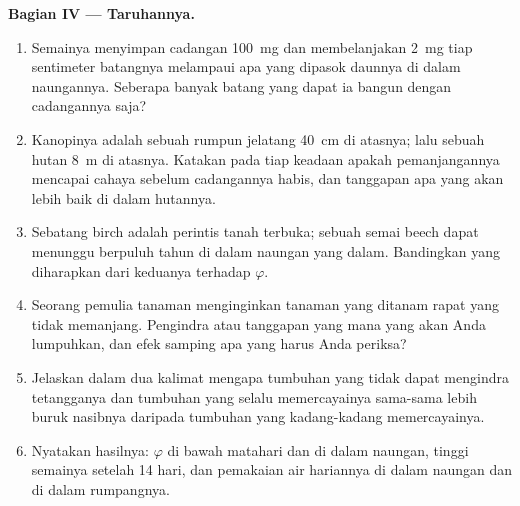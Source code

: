 \begin{problem}
\medskip
\noindent\textbf{Bagian IV --- Taruhannya.}
\begin{enumerate}[resume]
  \item Semainya menyimpan cadangan \qty{100}{mg} dan membelanjakan
        \qty{2}{mg} tiap sentimeter batangnya melampaui apa yang
        dipasok daunnya di dalam naungannya. Seberapa banyak batang
        yang dapat ia bangun dengan cadangannya saja?
  \item Kanopinya adalah sebuah rumpun jelatang \qty{40}{cm} di
        atasnya; lalu sebuah hutan \qty{8}{m} di atasnya. Katakan pada
        tiap keadaan apakah pemanjangannya mencapai cahaya sebelum
        cadangannya habis, dan tanggapan apa yang akan lebih baik di
        dalam hutannya.
  \item Sebatang birch adalah perintis tanah terbuka; sebuah semai
        beech dapat menunggu berpuluh tahun di dalam naungan yang
        dalam. Bandingkan  yang diharapkan dari keduanya
        terhadap $\varphi$.
  \item Seorang pemulia tanaman menginginkan tanaman yang ditanam
        rapat yang tidak memanjang. Pengindra atau tanggapan yang mana
        yang akan Anda lumpuhkan, dan efek samping apa yang harus Anda
        periksa?
  \item Jelaskan dalam dua kalimat mengapa tumbuhan yang tidak dapat
        mengindra tetangganya dan tumbuhan yang selalu memercayainya
        sama-sama lebih buruk nasibnya daripada tumbuhan yang
        kadang-kadang memercayainya.
  \item Nyatakan hasilnya: $\varphi$ di bawah matahari dan di dalam
        naungan, tinggi semainya setelah 14 hari, dan pemakaian air
        hariannya di dalam naungan dan di dalam rumpangnya.
\end{enumerate}
\end{problem}
